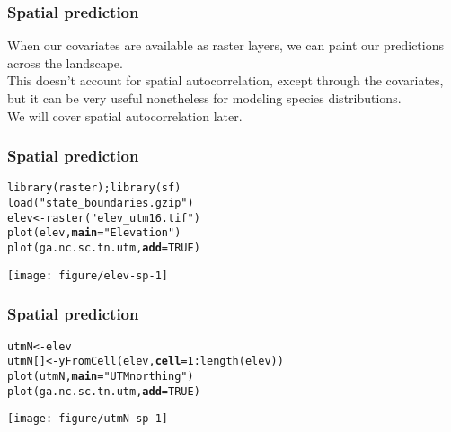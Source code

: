 \documentclass[color=usenames,dvipsnames]{beamer}\usepackage[]{graphicx}\usepackage[]{color}
\makeatletter
\newcommand{\hlnum}[1]{\textcolor[rgb]{0.69,0.494,0}{#1}}%
\newcommand{\hlstr}[1]{\textcolor[rgb]{0.749,0.012,0.012}{#1}}%
\newcommand{\hlopt}[1]{\textcolor[rgb]{0,0,0}{#1}}%
\newcommand{\hlstd}[1]{\textcolor[rgb]{0,0,0}{#1}}%
\newcommand{\hlkwb}[1]{\textcolor[rgb]{0,0.341,0.682}{#1}}%
\newcommand{\hlkwc}[1]{\textcolor[rgb]{0,0,0}{\textbf{#1}}}%
\newcommand{\hlkwd}[1]{\textcolor[rgb]{0.004,0.004,0.506}{#1}}%
\newenvironment{kframe}{%
 \def\at@end@of@kframe{}%
 \ifinner\ifhmode%
  \def\at@end@of@kframe{\end{minipage}}%
  \begin{minipage}{\columnwidth}%
 \fi\fi%
 \def\FrameCommand##1{\hskip\@totalleftmargin \hskip-\fboxsep
 \colorbox{shadecolor}{##1}\hskip-\fboxsep
     \hskip-\linewidth \hskip-\@totalleftmargin \hskip\columnwidth}%
 \MakeFramed {\advance\hsize-\width
   \@totalleftmargin\z@ \linewidth\hsize
   \@setminipage}}%
 {\par\unskip\endMakeFramed%
 \at@end@of@kframe}
\newenvironment{knitrout}{}{} %
\makeatother
\begin{document}
\begin{frame}
  \frametitle{Spatial prediction}
  When our covariates are available as raster layers, we can paint our
  predictions across the landscape. \\
  \pause
  \vfill
  This doesn't account for spatial autocorrelation, except through the
  covariates, but it can be very useful nonetheless for modeling
  species distributions. \\
  \pause
  \vfill
  We will cover spatial autocorrelation later. 
\end{frame}



\begin{frame}[fragile]
  \frametitle{Spatial prediction}
\begin{knitrout}\scriptsize
{}\color{fgcolor}\begin{kframe}
\begin{alltt}
\hlkwd{library}\hlstd{(raster);} \hlkwd{library}\hlstd{(sf)}
\hlkwd{load}\hlstd{(}\hlstr{"state_boundaries.gzip"}\hlstd{)}
\hlstd{elev} \hlkwb{<-} \hlkwd{raster}\hlstd{(}\hlstr{"elev_utm16.tif"}\hlstd{)}
\hlkwd{plot}\hlstd{(elev,} \hlkwc{main}\hlstd{=}\hlstr{"Elevation"}\hlstd{)}
\hlkwd{plot}\hlstd{(ga.nc.sc.tn.utm,} \hlkwc{add}\hlstd{=}\hlnum{TRUE}\hlstd{)}
\end{alltt}
\end{kframe}

{\centering \texttt{[image: figure/elev-sp-1]} 

}



\end{knitrout}
\end{frame}




\begin{frame}[fragile]
  \frametitle{Spatial prediction}
\begin{knitrout}\scriptsize
{}\color{fgcolor}\begin{kframe}
\begin{alltt}
\hlstd{utmN} \hlkwb{<-} \hlstd{elev}
\hlstd{utmN[]} \hlkwb{<-} \hlkwd{yFromCell}\hlstd{(elev,} \hlkwc{cell}\hlstd{=}\hlnum{1}\hlopt{:}\hlkwd{length}\hlstd{(elev))}
\hlkwd{plot}\hlstd{(utmN,} \hlkwc{main}\hlstd{=}\hlstr{"UTM northing"}\hlstd{)}
\hlkwd{plot}\hlstd{(ga.nc.sc.tn.utm,} \hlkwc{add}\hlstd{=}\hlnum{TRUE}\hlstd{)}
\end{alltt}
\end{kframe}

{\centering \texttt{[image: figure/utmN-sp-1]} 

}



\end{knitrout}
\end{frame}
\end{document}
